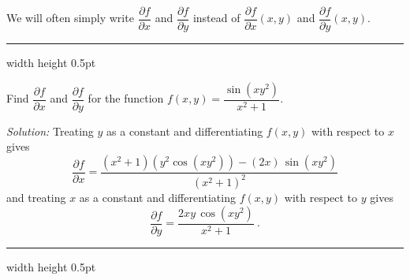 We will often simply write $\dfrac{\partial f}{\partial x}$ and $\dfrac{\partial f}{\partial y}$ instead of
$\dfrac{\partial f}{\partial x} (x,y)$ and $\dfrac{\partial f}{\partial y} (x,y)$.

\medskip
\hrule width \textwidth height 0.5pt
\begin{exmp}
 Find $\dfrac{\partial f}{\partial x}$ and $\dfrac{\partial f}{\partial y}$ for the function
 $f(x,y) = \dfrac{\sin (xy^2)}{x^2 + 1}$.\smallskip
 \par\noindent\emph{Solution:} Treating $y$ as a constant and differentiating $f(x,y)$ with respect to $x$ gives
 \begin{displaymath}
  \dfrac{\partial f}{\partial x} = \dfrac{(x^2 + 1)(y^2 \cos (xy^2)) - (2x)\,\sin (xy^2)}{(x^2 + 1)^2}
 \end{displaymath}
 and treating $x$ as a constant and differentiating $f(x,y)$ with respect to $y$ gives
 \begin{displaymath}
  \dfrac{\partial f}{\partial y} = \dfrac{2xy\,\cos (xy^2)}{x^2 + 1} ~.
 \end{displaymath}
\end{exmp}
\hrule width \textwidth height 0.5pt
\medskip

